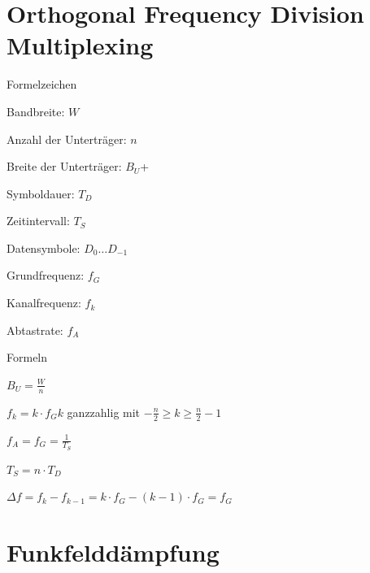 \documentclass[german]{latex4ei/latex4ei_sheet}
\begin{document}
    \section{Orthogonal Frequency Division Multiplexing}
    \begin{sectionbox}
        \begin{symbolbox}{Formelzeichen}
            \item Bandbreite: $W$
            \item Anzahl der Unterträger: $n$
            \item Breite der Unterträger: $B_U$+
            \item Symboldauer: $T_D$
            \item Zeitintervall: $T_S$ 
            \item Datensymbole: $D_0 \dots D_{-1}$
            \item Grundfrequenz: $f_G$
            \item Kanalfrequenz: $f_k$
            \item Abtastrate: $f_A$
        \end{symbolbox}
        
        \begin{bluebox}{Formeln}
            \item $B_U = \frac{W}{n}$
            \item $f_k =k \cdot f_G$\quad $k$ ganzzahlig mit $-\frac{n}{2}\geq k \geq \frac{n}{2}-1$ 
            \item $f_A = f_G = \frac{1}{T_S}$
            \item $T_S = n \cdot T_D$
            \item $\Delta f = f_k - f_{k-1} = k\cdot f_G -(k-1)\cdot f_G = f_G$
        \end{bluebox}
    \end{sectionbox}

    \section{Funkfelddämpfung}
\end{document}
